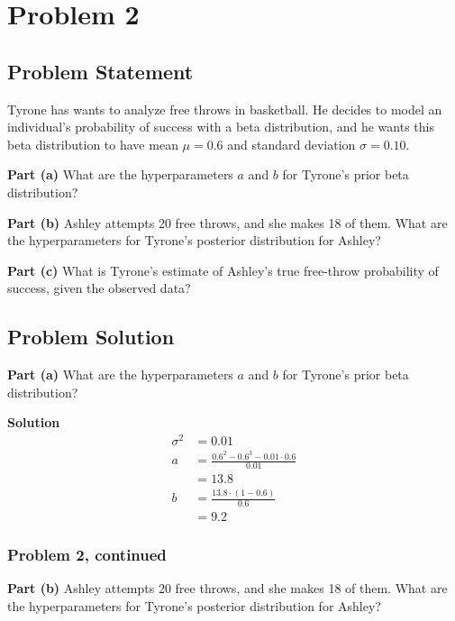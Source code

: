 \documentclass[12pt]{article}
\theoremstyle{definition}
\begin{document}
\newpage
\section*{Problem 2}

\subsection*{Problem Statement}

Tyrone has wants to analyze free throws in basketball. He decides to model an individual's probability of success with a beta distribution, and he wants this beta distribution to have mean $\mu = 0.6$ and standard deviation $\sigma = 0.10$. 

\bigskip
\noindent
{\bf Part (a)} What are the hyperparameters $a$ and $b$ for Tyrone's prior beta distribution?

\bigskip
\noindent
{\bf Part (b)} Ashley attempts 20 free throws, and she makes 18 of them. What are the hyperparameters for Tyrone's posterior distribution for Ashley?

\bigskip
\noindent
{\bf Part (c)} What is Tyrone's estimate of Ashley's true free-throw probability of success, given the observed data?



\subsection*{Problem Solution}

\noindent
{\bf Part (a)} What are the hyperparameters $a$ and $b$ for Tyrone's prior beta distribution?

\noindent
{\bf Solution} 
\begin{align*}
\sigma^2 &= 0.01\\
a &= \frac{0.6^2 - 0.6^3 - 0.01 \cdot 0.6}{0.01}\\
&= 13.8\\
b &= \frac{13.8 \cdot (1 - 0.6)}{0.6}\\
&= 9.2
\end{align*}



\newpage
\subsubsection*{Problem 2, continued}
\noindent
{\bf Part (b)} Ashley attempts 20 free throws, and she makes 18 of them. What are the hyperparameters for Tyrone's posterior distribution for Ashley?
\end{document}
